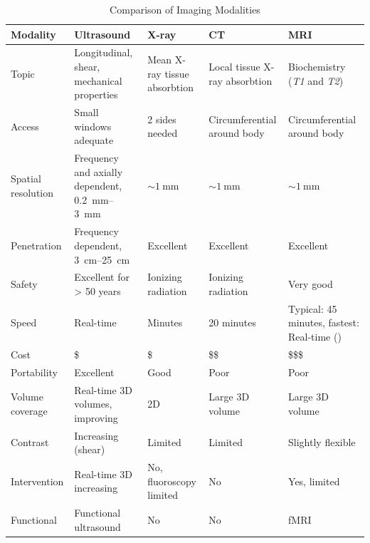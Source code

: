 \begin{table}[ht]
	\centering
	\begin{tabularx}{\textwidth}{@{}XXXXX@{}}
		\toprule
		\textbf{Modality} & \textbf{Ultrasound} & \textbf{X-ray} & \textbf{CT} & \textbf{MRI} \\ \midrule
		Topic              & Longitudinal, shear, mechanical properties              & Mean X-ray tissue absorbtion & Local tissue X-ray absorbtion & Biochemistry (\textit{T1} and \textit{T2})    \\
		Access             & Small windows adequate                                  & 2 sides needed               & Circumferential around body   & Circumferential around body \\
		Spatial resolution & Frequency and axially dependent, \SIrange{0.2}{3}{\milli\meter} & $\sim \SI{1}{\milli \meter}$           & $\sim \SI{1}{\milli \meter}$            & $\sim \SI{1}{\milli \meter}$          \\
		Penetration     & Frequency dependent, \SIrange{3}{25}{\centi\meter} & Excellent               & Excellent          & Excellent                                 \\
		Safety          & Excellent for > 50 years          & Ionizing radiation      & Ionizing radiation & Very good                                 \\
		Speed           & Real-time & Minutes & 20 minutes & Typical: 45 minutes, fastest: Real-time (\glsxtrshort{low-res}) \\
		Cost            & \$                                            & \$                      & \$\$                 & \$\$\$                                       \\
		Portability     & Excellent                                     & Good                    & Poor               & Poor                                      \\
		Volume coverage & Real-time 3D volumes, improving               & 2D                      & Large 3D volume    & Large 3D volume                           \\
		Contrast        & Increasing (shear)                            & Limited                 & Limited            & Slightly flexible                         \\
		Intervention    & Real-time 3D increasing                       & No, fluoroscopy limited & No                 & Yes, limited                              \\
		Functional      & Functional ultrasound                         & No                      & No                 & fMRI                                      \\ \bottomrule
	\end{tabularx}
	\caption{Comparison of Imaging Modalities \cite{Szabo_UltrasoundBook_2}}
	\label{tab:imaging_modalities}
\end{table}

